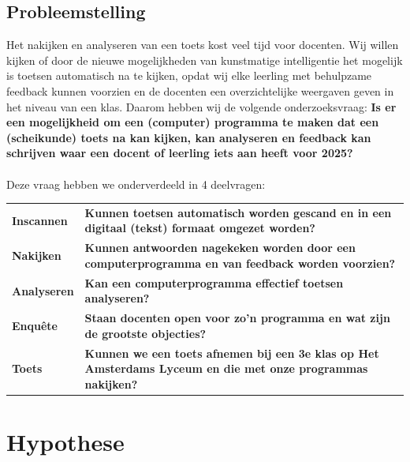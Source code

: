 \documentclass[12pt]{article}
\begin{document}
\begin{multicols}{2}
\subsection{Probleemstelling}
Het nakijken en analyseren van een toets kost veel tijd voor docenten. Wij willen kijken of door de nieuwe mogelijkheden van kunstmatige intelligentie het mogelijk is toetsen automatisch na te kijken, opdat wij elke leerling met behulpzame feedback kunnen voorzien en de docenten een overzichtelijke weergaven geven in het niveau van een klas.
Daarom hebben wij de volgende onderzoeksvraag: %
\textbf{Is er een mogelijkheid om een (computer) programma te maken dat een (scheikunde) toets na kan kijken, kan analyseren en feedback kan schrijven waar een docent of leerling iets aan heeft voor 2025?}
\\\\
Deze vraag hebben we onderverdeeld in 4 deelvragen:\\
\begin{tabularx}{\linewidth}{lX}
    \vspace{0.2cm}
   \textbf{Inscannen } & \textbf{Kunnen toetsen automatisch worden gescand en in een digitaal (tekst) formaat omgezet worden?} \\
   \vspace{0.2cm}
   \textbf{Nakijken } & \textbf{Kunnen antwoorden nagekeken worden door een computerprogramma en van feedback worden voorzien?} \\
   \vspace{0.2cm}
   \textbf{Analyseren } & \textbf{Kan een computerprogramma effectief toetsen analyseren?} \\
   \vspace{0.2cm}
   \textbf{Enquête } & \textbf{Staan docenten open voor zo'n programma en wat zijn de grootste objecties? } \\
   \vspace{0.2cm}
   \textbf{Toets } & \textbf{Kunnen we een toets afnemen bij een 3e klas op Het Amsterdams Lyceum en die met onze programmas nakijken? } \\
\end{tabularx}

\end{multicols}
\pagebreak


\section{Hypothese}
\end{document}
